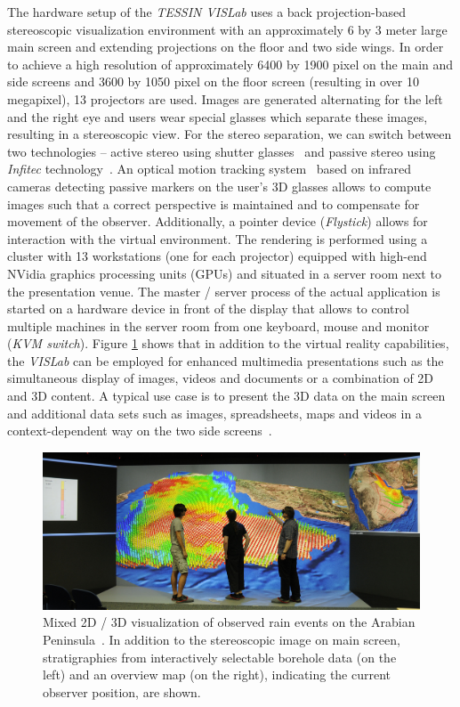 \documentclass[twocolumn]{svjour3}          %
\begin{document}
The hardware setup of the \emph{TESSIN VISLab} uses a back projection-based stereoscopic visualization environment with an approximately 6 by 3 meter large main screen and extending projections on the floor and two side wings. In order to achieve a high resolution of approximately 6400 by 1900 pixel on the main and side screens and 3600 by 1050 pixel on the floor screen (resulting in over 10 megapixel), 13 projectors are used. Images are generated alternating for the left and the right eye and users wear special glasses which separate these images, resulting in a stereoscopic view. For the stereo separation, we can switch between two technologies -- active stereo using shutter glasses~\cite{activestereo} and passive stereo using \emph{Infitec} technology~\cite{infitec}. An optical motion tracking system~\cite{tracking} based on infrared cameras detecting passive markers on the user's 3D glasses allows to compute images such that a correct perspective is maintained and to compensate for movement of the observer. Additionally, a pointer device (\emph{Flystick}) allows for interaction with the virtual environment. The rendering is performed using a cluster with 13 workstations (one for each projector) equipped with high-end NVidia graphics processing units (GPUs) and situated in a server room next to the presentation venue. The master / server process of the actual application is started on a hardware device in front of the display that allows to control multiple machines in the server room from one keyboard, mouse and monitor (\emph{KVM switch}). Figure \ref{fig:sa}  shows that in addition to the virtual reality capabilities, the \emph{VISLab} can be employed for enhanced multimedia presentations such as the simultaneous display of images, videos and documents or a combination of 2D and 3D content. A typical use case is to present the 3D data on the main screen and additional data sets such as images, spreadsheets, maps and videos in a context-dependent way on the two side screens~\cite{zehner:modelcare}.

\begin{figure}
  \includegraphics[width=1.0\textwidth]{images/sa_2d_3d.jpg}
\caption{Mixed 2D / 3D visualization of observed rain events on the Arabian Peninsula~\cite{rink:iwas}. In addition to the stereoscopic image on main screen, stratigraphies from interactively selectable borehole data (on the left) and an overview map (on the right), indicating the current observer position, are shown.}
\label{fig:sa}
\end{figure}
\end{document}
